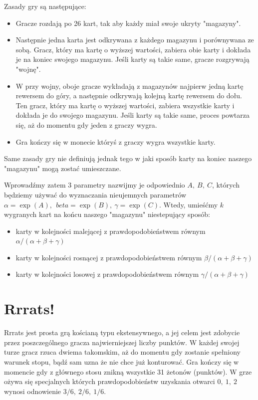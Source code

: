 \documentclass[inzynierska]{pwr_wmat_praca_dyplomowa}
\theoremstyle{plain}
\numberwithin{theorem}{chapter}
\theoremstyle{definition}
\numberwithin{theorem}{chapter}
\begin{document}
	Zasady gry są następujące:
	\begin{itemize}
		\item 	Gracze rozdają po 26 kart, tak aby każdy miał swoje ukryty "magazyny".
		
		\item Następnie jedna karta jest odkrywana z każdego magazynu i porównywana ze sobą. Gracz, który ma kartę o wyższej wartości, zabiera obie karty i dokłada je na koniec swojego magazynu. Jeśli karty są takie same, gracze rozgrywają "wojnę".
		
		\item W przy wojny, oboje gracze wykładają z magazynów najpierw jedną kartę rewersem do góry, a następnie odkrywają kolejną kartę rewersem do dołu. Ten gracz, który ma kartę o wyższej wartości, zabiera wszystkie karty i dokłada je do swojego magazynu. Jeśli karty są takie same, proces powtarza się, aż do momentu gdy jeden z graczy wygra.
		
		\item Gra kończy się w monecie któryś z graczy wygra wszystkie karty.
	\end{itemize}
	Same zasady gry nie definiują jednak tego w jaki sposób karty na koniec naszego "magazynu" mogą zostać umieszczane.
	
	Wprowadźmy zatem 3 parametry nazwijmy je odpowiednio $A,\:B,\:C$, których będziemy używać do wyznaczania nieujemnych parametrów $\alpha = \exp(A),\: \
	beta= \exp(B),\: \gamma= \exp(C)$. Wtedy, umieśćmy $k$ wygranych kart na końcu naszego "magazynu" niestepujący sposób:
	\begin{itemize}
		\item karty w kolejności malejącej z prawdopodobieństwem równym $\alpha/(\alpha+\beta+\gamma)$ 
		
		\item karty w kolejności rosnącej z prawdopodobieństwem równym $\beta/(\alpha+\beta+\gamma)$ 
		
		\item karty w kolejności losowej z prawdopodobieństwem równym $\gamma/(\alpha+\beta+\gamma)$ 
	\end{itemize}
	
	\section{Rrrats!}
	Rrrats jest prosta grą kościaną typu ekstensywnego, a jej celem jest zdobycie przez poszczególnego gracza najwierniejszej liczby punktów. W każdej swojej turze gracz rzuca dwiema takomskim, aż do momentu gdy zostanie spełniony warunek stopu, bądź sam uzna że nie chce już konturować. Gra kończy się w momencie gdy z głównego stosu znikną wszystkie 31 żetonów (punktów). W grze ożywa się specjalnych których prawdopodobieństw uzyskania otwarci $0,\:1,\:2$ wynosi odnowienie $3/6,\:2/6,\:1/6$.
	
\end{document}
